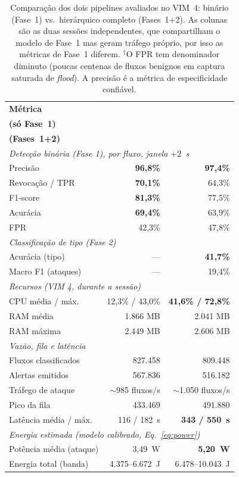\documentclass[12pt,a4paper]{article}
\begin{document}
\begin{table}[ht]
\centering
\caption{Comparação dos dois pipelines avaliados no VIM~4: binário (Fase~1) vs.\
hierárquico completo (Fases~1+2). As colunas são as duas sessões independentes,
que compartilham o modelo de Fase~1 mas geram tráfego próprio, por isso as
métricas de Fase~1 diferem. $^\dagger$O FPR tem denominador diminuto (poucas
centenas de fluxos benignos em captura saturada de \textit{flood}). A precisão é
a métrica de especificidade confiável.}
\label{tab:comparison}
\begin{tabular}{@{}lrr@{}}
\toprule
\textbf{Métrica} & \shortstack[r]{\textbf{IDS Binário}\\ \textbf{(só Fase~1)}}
                 & \shortstack[r]{\textbf{IDS Multiclasse}\\ \textbf{(Fases~1+2)}} \\ \midrule
\multicolumn{3}{l}{\textit{Detecção binária (Fase 1), por fluxo, janela $+2$~s}} \\
\quad Precisão            & \textbf{96,8\%} & \textbf{97,4\%} \\
\quad Revocação / TPR     & \textbf{70,1\%} & 64,3\% \\
\quad F1-score            & \textbf{81,3\%} & 77,5\% \\
\quad Acurácia            & \textbf{69,4\%} & 63,9\% \\
\quad FPR\rlap{$^\dagger$} & 42,3\%         & 47,8\% \\ \midrule
\multicolumn{3}{l}{\textit{Classificação de tipo (Fase 2)}} \\
\quad Acurácia (tipo)   & ---             & \textbf{41,7\%} \\
\quad Macro F1 (ataques) & ---            & 19,4\% \\
\midrule
\multicolumn{3}{l}{\textit{Recursos (VIM 4, durante a sessão)}} \\
\quad CPU média / máx.  & 12,3\% / 43,0\% & \textbf{41,6\% / 72,8\%} \\
\quad RAM média         & 1.866 MB        & 2.041 MB \\
\quad RAM máxima        & 2.449 MB        & 2.606 MB \\ \midrule
\multicolumn{3}{l}{\textit{Vazão, fila e latência}} \\
\quad Fluxos classificados & 827.458 & 809.448 \\
\quad Alertas emitidos  & 567.836 & 516.182 \\
\quad Tráfego de ataque & $\sim$985 fluxos/s & $\sim$1.050 fluxos/s \\
\quad Pico da fila      & 433.469 & 491.880 \\
\quad Latência média / máx.\ & 116 / 182~s & \textbf{343 / 550~s} \\ \midrule
\multicolumn{3}{l}{\textit{Energia estimada (modelo calibrado, Eq.~\ref{eq:power})}} \\
\quad Potência média (ataque) & 3,49~W & \textbf{5,20~W} \\
\quad Energia total (banda)   & 4.375--6.672~J & 6.478--10.043~J \\
\bottomrule
\end{tabular}
\end{table}
\end{document}

